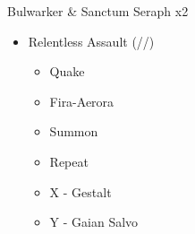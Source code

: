 \renewcommand{\second}{[2] Relentless Assault (\rav/\rav/\com)}

\begin{battle}[0:14]{Bulwarker \& Sanctum Seraph x2}
	\begin{itemize}
		\item \second
		      \begin{itemize}
			      \item Quake
			      \item Fira-Aerora
			      \item Summon
			      \item Repeat
			      \item X - Gestalt
			      \item Y - Gaian Salvo
		      \end{itemize}
	\end{itemize}
\end{battle}

